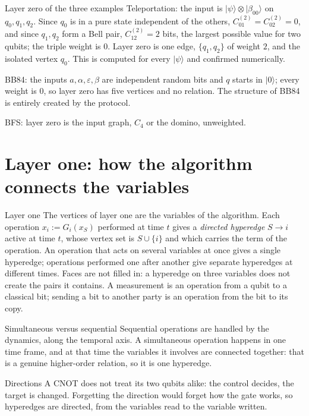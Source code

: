 \documentclass[11pt,a4paper]{article}
\providecommand{\ket}[1]{\lvert #1\rangle}
\begin{document}
\begin{ex}{Layer zero of the three examples}
Teleportation: the input is $\ket\psi\otimes\ket{\beta_{00}}$ on $q_0,q_1,q_2$. Since $q_0$ is in a pure state independent of the others, $C^{(2)}_{01}=C^{(2)}_{02}=0$, and since $q_1,q_2$ form a Bell pair, $C^{(2)}_{12}=2$ bits, the largest possible value for two qubits; the triple weight is $0$. Layer zero is one edge, $\{q_1,q_2\}$ of weight $2$, and the isolated vertex $q_0$. This is computed for every $\ket\psi$ and confirmed numerically.

BB84: the inputs $a,\alpha,\varepsilon,\beta$ are independent random bits and $q$ starts in $\ket0$; every weight is $0$, so layer zero has five vertices and no relation. The structure of BB84 is entirely created by the protocol.

BFS: layer zero is the input graph, $C_4$ or the domino, unweighted.
\end{ex}

\section{Layer one: how the algorithm connects the variables}\label{sec:layer1}

\begin{defn}{Layer one}
The vertices of layer one are the variables of the algorithm. Each operation $x_i:=G_i(x_S)$ performed at time $t$ gives a \emph{directed hyperedge} $S\to i$ active at time $t$, whose vertex set is $S\cup\{i\}$ and which carries the term of the operation. An operation that acts on several variables at once gives a single hyperedge; operations performed one after another give separate hyperedges at different times. Faces are not filled in: a hyperedge on three variables does not create the pairs it contains. A measurement is an operation from a qubit to a classical bit; sending a bit to another party is an operation from the bit to its copy.
\end{defn}

\begin{why}{Simultaneous versus sequential}
Sequential operations are handled by the dynamics, along the temporal axis. A simultaneous operation happens in one time frame, and at that time the variables it involves are connected together: that is a genuine higher-order relation, so it is one hyperedge.
\end{why}

\begin{why}{Directions}
A CNOT does not treat its two qubits alike: the control decides, the target is changed. Forgetting the direction would forget how the gate works, so hyperedges are directed, from the variables read to the variable written.
\end{why}
\end{document}
